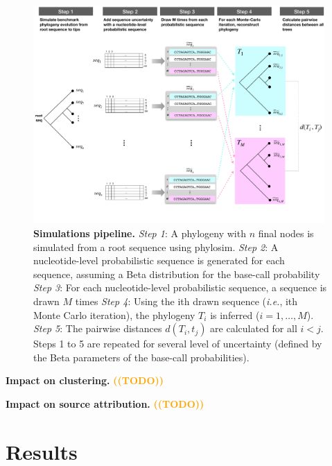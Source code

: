 \documentclass[10pt]{article}
\newcommand{\warning}[1]{\textbf{\textcolor{orange}{((#1))}}}
\newcommand{\ie}{\textit{i.e.},\xspace}
\newcommand{\nlps}{nucleotide-level probabilistic sequence\xspace}
\begin{document}
\begin{figure}[ht]
\centering
    \includegraphics[width=0.99\textwidth]{figs/pipeline.pdf}
\caption{\textbf{Simulations pipeline.} 
\textit{Step 1}: A phylogeny with $n$ final nodes is simulated from a root sequence using \textsf{phylosim}.
\textit{Step 2}: A \nlps is generated for each sequence, assuming a Beta distribution for the base-call probability
\textit{Step 3}: For each \nlps, a sequence is drawn $M$ times
\textit{Step 4}: Using the ith drawn sequence (\ie ith Monte Carlo iteration), the phylogeny $T_i$ is inferred ($i=1,\ldots,M$). 
\textit{Step 5}: The pairwise distances $d(T_i, t_j)$ are calculated for all $i<j$.
Steps 1 to 5 are repeated for several level of uncertainty (defined by the Beta parameters of the base-call probabilities).
}
\label{fig:pipeline}
\end{figure}


\textbf{Impact on clustering.}
\warning{TODO}

\textbf{Impact on source attribution.}
\warning{TODO}







\section{Results}

\newpage

\end{document}
